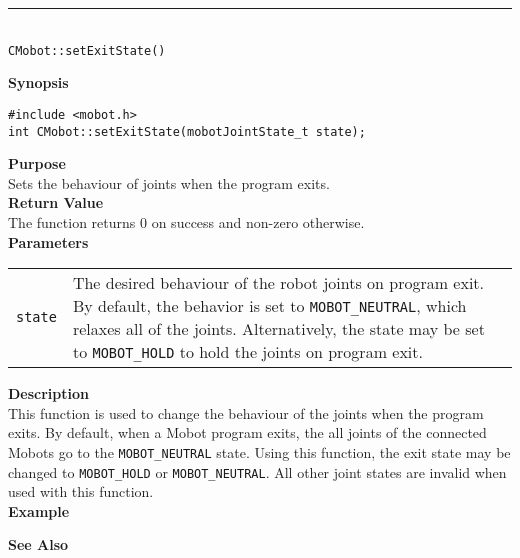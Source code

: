 \noindent
\vspace{5pt}
\rule{4.5in}{0.015in}\\
\noindent
{\LARGE \texttt{CMobot::setExitState()}}\\
{}

\noindent
{\bf Synopsis}
\vspace{-8pt}
\begin{verbatim}
#include <mobot.h>
int CMobot::setExitState(mobotJointState_t state);
\end{verbatim}

\noindent
{\bf Purpose}\\
Sets the behaviour of joints when the program exits.\\

\noindent
{\bf Return Value}\\
The function returns 0 on success and non-zero otherwise.\\

\noindent
{\bf Parameters}
\vspace{-0.1in}
\begin{description}
\item               
\begin{tabular}{p{10 mm}p{145 mm}}
\texttt{state} & The desired behaviour of the robot joints on program exit. By
default, the behavior is set to \texttt{MOBOT\_NEUTRAL}, which relaxes all of
the joints. Alternatively, the state may be set to \texttt{MOBOT\_HOLD} to hold
the joints on program exit. \\
\end{tabular}
\end{description}

\noindent
{\bf Description}\\
This function is used to change the behaviour of the joints when the program
exits. By default, when a Mobot program exits, the all joints of the connected
Mobots go to the \texttt{MOBOT\_NEUTRAL} state. Using this function, the exit
state may be changed to \texttt{MOBOT\_HOLD} or \texttt{MOBOT\_NEUTRAL}. All
other joint states are invalid when used with this function.
\noindent\\
{\bf Example}\\
\noindent

\noindent
{\bf See Also}\\


